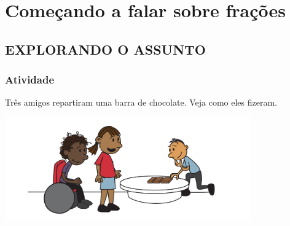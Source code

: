%
%
%


\setcounter{chapter}{0}
\chapter{Começando a falar sobre frações }
\setcounter{page}{1}
\section{EXPLORANDO O ASSUNTO }

\subsection{Atividade}

Três amigos repartiram uma barra de chocolate. Veja como eles fizeram.

  \begin{center}
    \includegraphics[width=300pt, keepaspectratio]{../figuras/licao01/ativ1_fig01.png}
  \end{center}

